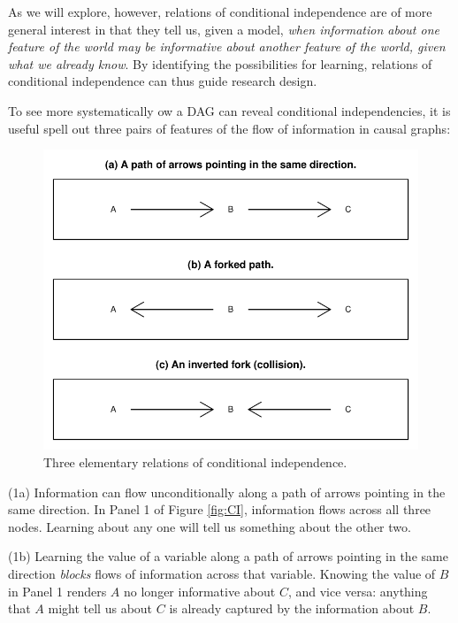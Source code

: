 \documentclass[12pt,]{book}
\begin{document}
As we will explore, however, relations of conditional independence are of more general interest in that they tell us, given a model, \emph{when information about one feature of the world may be informative about another feature of the world, given what we already know}. By identifying the possibilities for learning, relations of conditional independence can thus guide research design.

To see more systematically ow a DAG can reveal conditional independencies, it is useful spell out three pairs of features of the flow of information in causal graphs:

\begin{figure}

{\centering \includegraphics[width=.9\textwidth]{ii_files/figure-latex/unnamed-chunk-6-1} 

}

\caption{\label{fig:CI} Three elementary relations of conditional independence.}\label{fig:unnamed-chunk-6}
\end{figure}

(1a) Information can flow unconditionally along a path of arrows pointing in the same direction. In Panel 1 of Figure \ref{fig:CI}, information flows across all three nodes. Learning about any one will tell us something about the other two.

(1b) Learning the value of a variable along a path of arrows pointing in the same direction \emph{blocks} flows of information across that variable. Knowing the value of \(B\) in Panel 1 renders \(A\) no longer informative about \(C\), and vice versa: anything that \(A\) might tell us about \(C\) is already captured by the information about \(B\).
\end{document}
